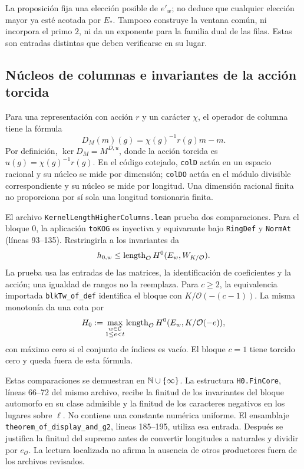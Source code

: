 La proposición fija una elección posible de $e'_w$; no deduce
que cualquier elección mayor ya esté acotada por $E_*$. Tampoco
construye la ventana común, ni incorpora el primo $2$, ni da un
exponente para la familia dual de las filas. Estas son entradas
distintas que deben verificarse en su lugar.

\subsection{Núcleos de columnas e invariantes de la acción torcida}
\label{subsec:lu-h0-fuente}

Para una representación con acción $r$ y un carácter $\chi$, el
operador de columna tiene la fórmula
\begin{equation}
 D_M(m)(g)=\chi(g)^{-1}r(g)m-m.
 \label{eq:lu-d-columna}
\end{equation}
Por definición, $\ker D_M=M^{D,u}$, donde la acción torcida es
$u(g)=\chi(g)^{-1}r(g)$. En el código cotejado, \texttt{colD}
actúa en un espacio racional y su núcleo se mide por dimensión;
\texttt{colDO} actúa en el módulo divisible correspondiente y su
núcleo se mide por longitud. Una dimensión racional finita no
proporciona por sí sola una longitud torsionaria finita.

El archivo \texttt{KernelLengthHigherColumns.lean} prueba dos
comparaciones. Para el bloque $0$, la aplicación \texttt{toKOG}
es inyectiva y equivarante bajo \texttt{RingDef} y \texttt{NormAt}
(líneas 93--135). Restringirla a los invariantes da
\begin{equation}
 h_{0,w}\le\operatorname{length}_{\mathcal O}H^0(E_w,W_{K/\mathcal O}).
 \label{eq:lu-h0-bloque}
\end{equation}
La prueba usa las entradas de las matrices, la identificación de
coeficientes y la acción; una igualdad de rangos no la reemplaza.
Para $c\ge2$, la equivalencia importada
\texttt{blkTw\_of\_def} identifica el bloque con
$K/\mathcal O(-(c-1))$. La misma monotonía da una cota por
\begin{equation}
 H_0:=\max_{\substack{w\in\mathcal C\\1\le e<t}}
       \operatorname{length}_{\mathcal O}H^0(E_w,K/\mathcal O(-e)),
 \label{eq:lu-h0-def}
\end{equation}
con máximo cero si el conjunto de índices es vacío. El bloque
$c=1$ tiene torcido cero y queda fuera de esta fórmula.

Estas comparaciones se demuestran en $\mathbb{N}\cup\{\infty\}$.
La estructura \texttt{H0.FinCore}, líneas 66--72 del mismo archivo,
recibe la finitud de los invariantes del bloque automorfo en su
clase admisible y la finitud de los caracteres negativos en los
lugares sobre $\ell$. No contiene una constante numérica uniforme.
El ensamblaje \texttt{theorem\_of\_display\_and\_g2}, líneas
185--195, utiliza esa entrada. Después se justifica la finitud
del supremo antes de convertir longitudes a naturales y dividir
por $e_{\mathcal O}$. La lectura localizada no afirma la ausencia
de otros productores fuera de los archivos revisados.

